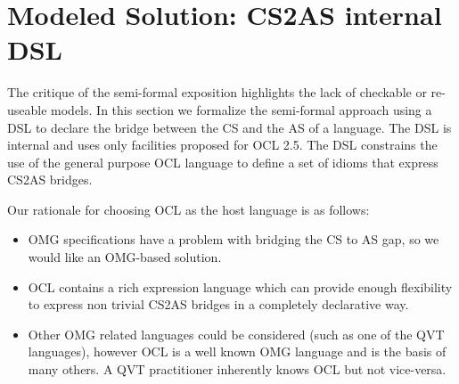 \documentclass{llncs}
\begin{document}



\section{Modeled Solution: CS2AS internal DSL}
\label{sec:solution}

The critique of the semi-formal exposition highlights the lack of checkable or re-useable models. In this section we formalize the semi-formal approach using a DSL to declare the bridge between the CS and the AS of a language. The DSL is  internal\cite{fowler2010dsl} and uses only facilities proposed for OCL 2.5. The DSL constrains the use of the general purpose OCL language to define  a set of idioms that express CS2AS bridges.

Our rationale for choosing OCL as the host language is as follows:
\begin{itemize}
\item OMG specifications have a problem with bridging the CS to AS gap, so we would like an OMG-based solution.
\item OCL contains a rich expression language which can provide enough flexibility to express non trivial CS2AS bridges in a completely declarative way.
\item Other OMG related languages could be considered (such as one of the QVT languages), however OCL is a well known OMG language and is the basis of many others. A QVT practitioner inherently knows OCL but not vice-versa.
\end{itemize}
\end{document}
